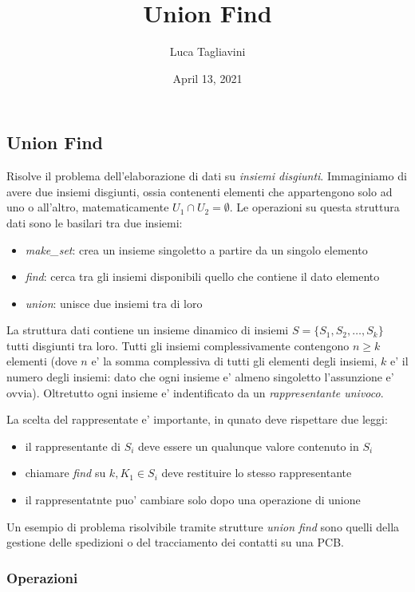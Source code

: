 \documentclass{article}
\title{\textbf{Union Find}}
\author{Luca Tagliavini}
\date{April 13, 2021}
\begin{document}
\maketitle
\tableofcontents
\pagebreak

\subsection{Union Find}

Risolve il problema dell'elaborazione di dati su \emph{insiemi disgiunti}.
Immaginiamo di avere due insiemi disgiunti, ossia contenenti elementi che appartengono
solo ad uno o all'altro, matematicamente $U_1 \cap U_2 = \emptyset$. Le operazioni
su questa struttura dati sono le basilari tra due insiemi:

\begin{itemize}
  \item \emph{make\_set}: crea un insieme singoletto a partire da un singolo
    elemento
  \item \emph{find}: cerca tra gli insiemi disponibili quello che contiene il
    dato elemento
  \item \emph{union}: unisce due insiemi tra di loro
\end{itemize}

La struttura dati contiene un insieme dinamico di insiemi
$S = \{ S_1, S_2, \ldots, S_k \}$ tutti disgiunti tra loro. Tutti gli insiemi
complessivamente contengono $n \geq k$ elementi (dove $n$ e' la somma complessiva
di tutti gli elementi degli insiemi, $k$ e' il numero degli insiemi: dato che ogni
insieme e' almeno singoletto l'assunzione e' ovvia).
Oltretutto ogni insieme e' indentificato da un \emph{rappresentante univoco}.

La scelta del rappresentate e' importante, in qunato deve rispettare due leggi:
\begin{itemize}
  \item il rappresentante di $S_i$ deve essere un qualunque valore contenuto in $S_i$
  \item chiamare \emph{find} su $k, K_1 \in S_i$ deve restituire lo stesso rappresentante
  \item il rappresentatnte puo' cambiare solo dopo una operazione di unione
\end{itemize}

Un esempio di problema risolvibile tramite strutture \emph{union find} sono quelli
della gestione delle spedizioni o del tracciamento dei contatti su una PCB.

\subsubsection{Operazioni}
\end{document}
